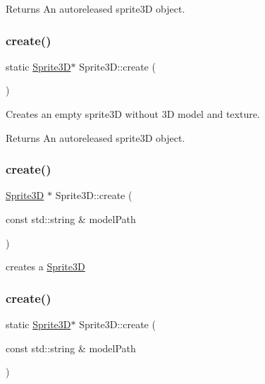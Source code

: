 \begin{DoxyReturn}{Returns}
An autoreleased sprite3D object. 
\end{DoxyReturn}
\mbox{\label{classSprite3D_ac266874371868d5fc125a45fcf31cf6c}} 
\subsubsection{\texorpdfstring{create()}{create()}\hspace{0.1cm}{\footnotesize\ttfamily [2/4]}}
{\footnotesize\ttfamily static \hyperlink{classSprite3D}{Sprite3D}$\ast$ Sprite3\+D\+::create (\begin{DoxyParamCaption}{ }\end{DoxyParamCaption})\hspace{0.3cm}{\ttfamily [static]}}

Creates an empty sprite3D without 3D model and texture.

\begin{DoxyReturn}{Returns}
An autoreleased sprite3D object. 
\end{DoxyReturn}
\mbox{\label{classSprite3D_ab739633591bc691de054e3a5b9a25c32}} 
\subsubsection{\texorpdfstring{create()}{create()}\hspace{0.1cm}{\footnotesize\ttfamily [3/4]}}
{\footnotesize\ttfamily \hyperlink{classSprite3D}{Sprite3D} $\ast$ Sprite3\+D\+::create (\begin{DoxyParamCaption}\item[{const std\+::string \&}]{model\+Path }\end{DoxyParamCaption})\hspace{0.3cm}{\ttfamily [static]}}

creates a \hyperlink{classSprite3D}{Sprite3D} \mbox{\label{classSprite3D_ab8a42bf2fab8845ead145605c25f1731}} 
\subsubsection{\texorpdfstring{create()}{create()}\hspace{0.1cm}{\footnotesize\ttfamily [4/4]}}
{\footnotesize\ttfamily static \hyperlink{classSprite3D}{Sprite3D}$\ast$ Sprite3\+D\+::create (\begin{DoxyParamCaption}\item[{const std\+::string \&}]{model\+Path }\end{DoxyParamCaption})\hspace{0.3cm}{\ttfamily [static]}}

